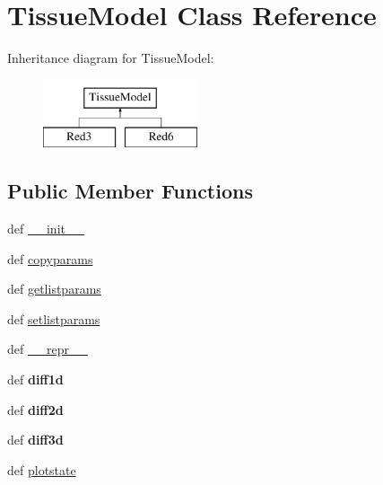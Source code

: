 \hypertarget{classcell__mdl_1_1_tissue_model}{
\section{TissueModel Class Reference}
\label{classcell__mdl_1_1_tissue_model}
}
Inheritance diagram for TissueModel:\begin{figure}[H]
\begin{center}
\leavevmode
\includegraphics[height=2cm]{classcell__mdl_1_1_tissue_model}
\end{center}
\end{figure}
\subsection*{Public Member Functions}
\begin{DoxyCompactItemize}
\item 
def \hyperlink{classcell__mdl_1_1_tissue_model_ac775ee34451fdfa742b318538164070e}{\_\-\_\-init\_\-\_\-}
\item 
def \hyperlink{classcell__mdl_1_1_tissue_model_a18cbf53eb92c048eacd39a7844d1ec80}{copyparams}
\item 
def \hyperlink{classcell__mdl_1_1_tissue_model_af7fb94e292201b2f2f604451032f38cc}{getlistparams}
\item 
def \hyperlink{classcell__mdl_1_1_tissue_model_ad28a0977f1887b1c30f096d38b28215c}{setlistparams}
\item 
def \hyperlink{classcell__mdl_1_1_tissue_model_ad8b9328939df072e4740cd9a63189744}{\_\-\_\-repr\_\-\_\-}
\item 
\hypertarget{classcell__mdl_1_1_tissue_model_a9cc821f7aefa54284b62f694eac0864d}{
def {\bfseries diff1d}}
\label{classcell__mdl_1_1_tissue_model_a9cc821f7aefa54284b62f694eac0864d}

\item 
\hypertarget{classcell__mdl_1_1_tissue_model_ac60b77951425af4c19b532efbfae57ad}{
def {\bfseries diff2d}}
\label{classcell__mdl_1_1_tissue_model_ac60b77951425af4c19b532efbfae57ad}

\item 
\hypertarget{classcell__mdl_1_1_tissue_model_a3be5bc7f26e6d6c029ec1d4674f899a2}{
def {\bfseries diff3d}}
\label{classcell__mdl_1_1_tissue_model_a3be5bc7f26e6d6c029ec1d4674f899a2}

\item 
def \hyperlink{classcell__mdl_1_1_tissue_model_aa124f33cab14b4466d10c00c8ec82875}{plotstate}
\end{DoxyCompactItemize}
